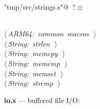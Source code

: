 \documentclass[11pt,a4paper,twoside,openright,DIV=15]{scrbook}
\theoremstyle{definition}
\theoremstyle{plain}
\theoremstyle{remark}
\begin{document}
\begin{flushleft} \small
\begin{minipage}{\linewidth}\label{scrap88}\raggedright\small
{} \verb@"tmp/src/strings.s"@\nobreak\ {\footnotesize {?}}$\equiv$
\vspace{-1ex}
\begin{list}{}{} \item
\mbox{}\verb@@\\
\mbox{}\verb@@\hbox{$\langle\,${\itshape ARM64: common macros}\nobreak\ {\footnotesize {}}$\,\rangle$}\verb@@\\
\mbox{}\verb@@\hbox{$\langle\,${\itshape String: strlen}\nobreak\ {\footnotesize {}}$\,\rangle$}\verb@@\\
\mbox{}\verb@@\hbox{$\langle\,${\itshape String: memcpy}\nobreak\ {\footnotesize {}}$\,\rangle$}\verb@@\\
\mbox{}\verb@@\hbox{$\langle\,${\itshape String: memcmp}\nobreak\ {\footnotesize {}}$\,\rangle$}\verb@@\\
\mbox{}\verb@@\hbox{$\langle\,${\itshape String: memset}\nobreak\ {\footnotesize {}}$\,\rangle$}\verb@@\\
\mbox{}\verb@@\hbox{$\langle\,${\itshape String: strcmp}\nobreak\ {\footnotesize {}}$\,\rangle$}\verb@@\\
\mbox{}\verb@@{\NWsep}
\end{list}
\vspace{-1.5ex}
\footnotesize
\begin{list}{}{\setlength{\itemsep}{-\parsep}\setlength{\itemindent}{-\leftmargin}}

\item{}
\end{list}
\end{minipage}\vspace{4ex}
\end{flushleft}
\noindent\textbf{io.s} --- buffered file I/O:
\end{document}
